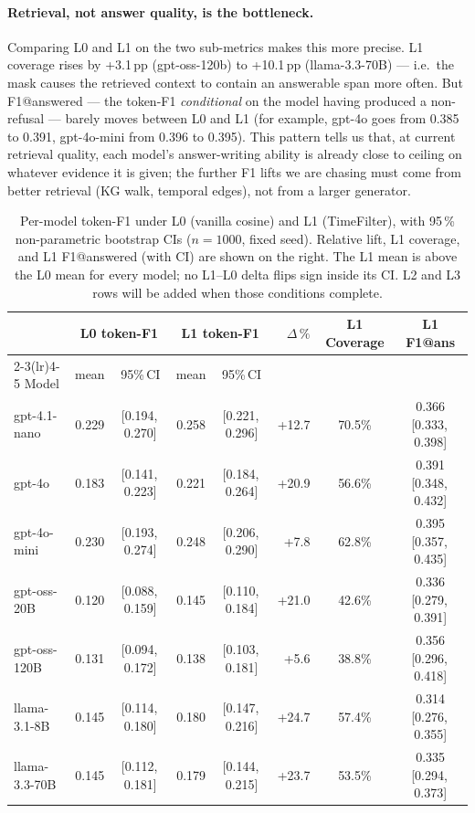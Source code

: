 \documentclass[11pt]{article}
\begin{document}
\paragraph{Retrieval, not answer quality, is the bottleneck.}
Comparing L0 and L1 on the two sub-metrics makes this more precise.
L1 coverage rises by +3.1\,pp (gpt-oss-120b) to +10.1\,pp
(llama-3.3-70B) --- i.e.\ the mask causes the retrieved context to
contain an answerable span more often. But F1@answered --- the
token-F1 \emph{conditional} on the model having produced a non-refusal
--- barely moves between L0 and L1 (for example, gpt-4o goes from
0.385 to 0.391, gpt-4o-mini from 0.396 to 0.395). This pattern tells
us that, at current retrieval quality, each model's answer-writing
ability is already close to ceiling on whatever evidence it is given;
the further F1 lifts we are chasing must come from better retrieval
(KG walk, temporal edges), not from a larger generator.

\begin{table}[t]
\centering
\small
\setlength{\tabcolsep}{4pt}
\begin{tabular}{l cc cc r c c}
\toprule
 & \multicolumn{2}{c}{L0 token-F1} & \multicolumn{2}{c}{L1 token-F1} & $\Delta\,\%$ & L1 Coverage & L1 F1@ans \\
\cmidrule(lr){2-3}\cmidrule(lr){4-5}
Model          & mean  & 95\%\,CI         & mean  & 95\%\,CI         &           &         &                      \\
\midrule
gpt-4.1-nano   & 0.229 & [0.194,\,0.270]  & 0.258 & [0.221,\,0.296]  & +12.7     & 70.5\%  & 0.366 [0.333,\,0.398] \\
gpt-4o         & 0.183 & [0.141,\,0.223]  & 0.221 & [0.184,\,0.264]  & +20.9     & 56.6\%  & 0.391 [0.348,\,0.432] \\
gpt-4o-mini    & 0.230 & [0.193,\,0.274]  & 0.248 & [0.206,\,0.290]  & \phantom{0}+7.8  & 62.8\% & 0.395 [0.357,\,0.435] \\
gpt-oss-20B    & 0.120 & [0.088,\,0.159]  & 0.145 & [0.110,\,0.184]  & +21.0     & 42.6\%  & 0.336 [0.279,\,0.391] \\
gpt-oss-120B   & 0.131 & [0.094,\,0.172]  & 0.138 & [0.103,\,0.181]  & \phantom{0}+5.6  & 38.8\% & 0.356 [0.296,\,0.418] \\
llama-3.1-8B   & 0.145 & [0.114,\,0.180]  & 0.180 & [0.147,\,0.216]  & +24.7     & 57.4\%  & 0.314 [0.276,\,0.355] \\
llama-3.3-70B  & 0.145 & [0.112,\,0.181]  & 0.179 & [0.144,\,0.215]  & +23.7     & 53.5\%  & 0.335 [0.294,\,0.373] \\
\bottomrule
\end{tabular}
\caption{Per-model token-F1 under L0 (vanilla cosine) and L1
(TimeFilter), with 95\,\% non-parametric bootstrap CIs ($n=1000$,
fixed seed). Relative lift, L1 coverage, and L1 F1@answered (with CI)
are shown on the right. The L1 mean is above the L0 mean for every
model; no L1--L0 delta flips sign inside its CI. L2 and L3 rows will
be added when those conditions complete.}
\label{tab:overall}
\end{table}
\end{document}
